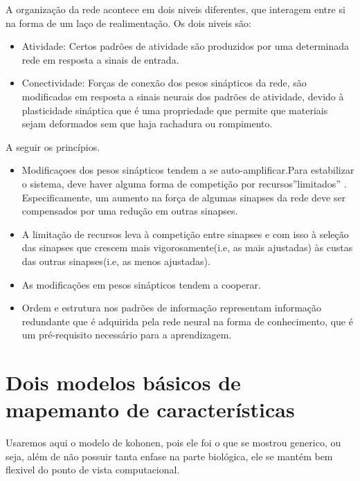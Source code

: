 	A organização da rede acontece em dois niveis diferentes, que interagem entre si na forma de um laço de realimentação. Os dois niveis são:
\begin{itemize}
\item  Atividade: Certos padrões de atividade são produzidos por uma determinada rede em resposta a sinais de entrada.
\item Conectividade: Forças de conexão dos pesos sinápticos da rede, são modificadas em resposta a sinais neurais dos padrões de atividade, devido à plasticidade sináptica que é uma propriedade que permite que materiais sejam deformados sem que haja rachadura ou rompimento. 
\end{itemize}
A seguir os princípios.
\begin{itemize}
\item  Modificaçoes dos pesos  sinápticos tendem a se auto-amplificar.Para estabilizar o sistema, deve haver alguma forma de competição por recursos”limitados” . Especificamente, um aumento na força de algumas sinapses da rede deve ser compensados por uma redução em outras sinapses.
\item  A limitação de recursos leva à competição entre sinapses e com isso à seleção das sinapses  que crescem mais vigorosamente(i.e, as mais ajustadas) às custas das outras sinapses(i.e, as menos ajustadas).
\item As modificações em pesos sinápticos tendem a cooperar.
\item Ordem e estrutura nos padrões de informação representam informação redundante que é adquirida pela rede neural na forma de conhecimento, que é um pré-requisito necessário para a aprendizagem.
\end{itemize}
\section {Dois modelos básicos de mapemanto de características}
	Usaremos aqui o modelo de kohonen, pois ele foi o que  se mostrou generico, ou seja, além de não possuir tanta enfase na parte biológica, ele se mantém bem flexivel do ponto de vista computacional.

